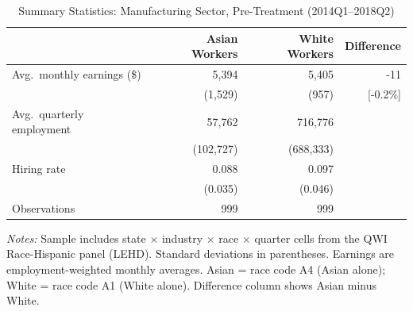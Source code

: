 \begin{table}[H]
\centering
\caption{Summary Statistics: Manufacturing Sector, Pre-Treatment (2014Q1--2018Q2)}
\begin{threeparttable}
\begin{tabular}{lrrr}
\toprule
 & Asian Workers & White Workers & Difference \\
\midrule
Avg.\ monthly earnings (\$) & 5,394 & 5,405 & -11 \\
 & (1,529) & (957) & [-0.2\%] \\
Avg.\ quarterly employment & 57,762 & 716,776 & \\
 & (102,727) & (688,333) & \\
Hiring rate & 0.088 & 0.097 & \\
 & (0.035) & (0.046) & \\
\midrule
Observations & 999 & 999 & \\
\bottomrule
\end{tabular}
\begin{tablenotes}[flushleft]
\small
\item \textit{Notes:} Sample includes state $\times$ industry $\times$ race $\times$ quarter cells from the QWI Race-Hispanic panel (LEHD). Standard deviations in parentheses. Earnings are employment-weighted monthly averages. Asian = race code A4 (Asian alone); White = race code A1 (White alone). Difference column shows Asian minus White.
\end{tablenotes}
\end{threeparttable}
\label{tab:summary}
\end{table}

